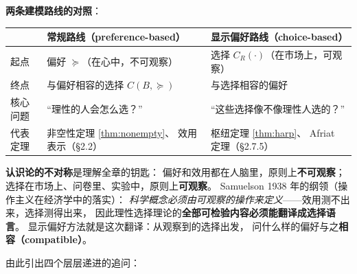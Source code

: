 \textbf{两条建模路线的对照}：
\begin{center}
\small
\begin{tabular}{p{3.4cm}p{5.2cm}p{5.2cm}}
\toprule
 & \textbf{常规路线（preference-based）} & \textbf{显示偏好路线（choice-based）} \\
\midrule
起点 & 偏好 $\succeq$（在心中，不可观察） & 选择 $C_R(\cdot)$（在市场上，可观察） \\
终点 & 与偏好相容的选择 $C(B,\succeq)$ & 与选择相容的偏好 \\
核心问题 & “理性的人会怎么选？” & “这些选择像不像理性人选的？” \\
代表定理 & 非空性定理 \ref{thm:nonempty}、
效用表示（§2.2） & 枢纽定理 \ref{thm:harp}、
Afriat 定理（§2.7.5） \\
\bottomrule
\end{tabular}
\end{center}

\textbf{认识论的不对称}是理解全章的钥匙：
偏好和效用都在人脑里，原则上\textbf{不可观察}；
选择在市场上、问卷里、实验中，原则上\textbf{可观察}。
Samuelson 1938 年的纲领（操作主义在经济学中的落实）：
\emph{科学概念必须由可观察的操作来定义}——效用测不出来，选择测得出来，
因此理性选择理论的\textbf{全部可检验内容必须能翻译成选择语言}。
显示偏好方法就是这次翻译：从观察到的选择出发，
问什么样的偏好与之\textbf{相容（compatible）}。

由此引出四个层层递进的追问：

